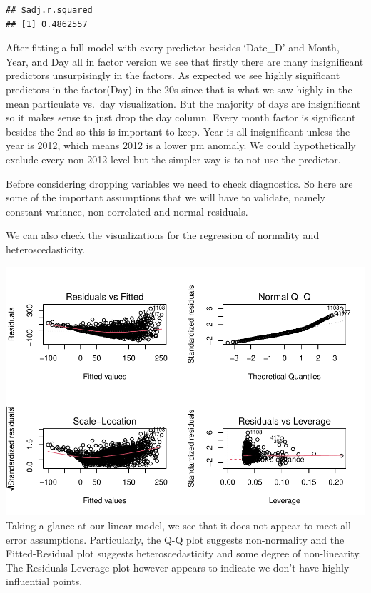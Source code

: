 \documentclass[
]{article}
\begin{document}
\begin{verbatim}
## $adj.r.squared
## [1] 0.4862557
\end{verbatim}

After fitting a full model with every predictor besides `Date\_D' and
Month, Year, and Day all in factor version we see that firstly there are
many insignificant predictors unsurpisingly in the factors. As expected
we see highly significant predictors in the factor(Day) in the 20s since
that is what we saw highly in the mean particulate vs.~day
visualization. But the majority of days are insignificant so it makes
sense to just drop the day column. Every month factor is significant
besides the 2nd so this is important to keep. Year is all insignificant
unless the year is 2012, which means 2012 is a lower pm anomaly. We
could hypothetically exclude every non 2012 level but the simpler way is
to not use the predictor.

Before considering dropping variables we need to check diagnostics. So
here are some of the important assumptions that we will have to
validate, namely constant variance, non correlated and normal residuals.

We can also check the visualizations for the regression of normality and
heteroscedasticity.

\includegraphics{Final_Project_2_files/figure-latex/unnamed-chunk-9-1.pdf}
Taking a glance at our linear model, we see that it does not appear to
meet all error assumptions. Particularly, the Q-Q plot suggests
non-normality and the Fitted-Residual plot suggests heteroscedasticity
and some degree of non-linearity. The Residuals-Leverage plot however
appears to indicate we don't have highly influential points.
\end{document}
